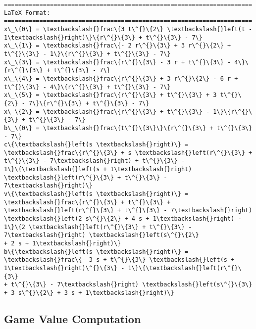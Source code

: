 \documentclass[../../main/main.tex]{subfiles}
\begin{document}
    \begin{Verbatim}[commandchars=\\\{\}]
======================================================================
LaTeX Format:
======================================================================
x\_\{0\} = \textbackslash{}frac\{3 t\^{}\{2\} \textbackslash{}left(t - 1\textbackslash{}right)\}\{r\^{}\{3\} + t\^{}\{3\} - 7\}
x\_\{1\} = \textbackslash{}frac\{- 2 r\^{}\{3\} + 3 r\^{}\{2\} + t\^{}\{3\} - 1\}\{r\^{}\{3\} + t\^{}\{3\} - 7\}
x\_\{3\} = \textbackslash{}frac\{r\^{}\{3\} - 3 r + t\^{}\{3\} - 4\}\{r\^{}\{3\} + t\^{}\{3\} - 7\}
x\_\{4\} = \textbackslash{}frac\{r\^{}\{3\} + 3 r\^{}\{2\} - 6 r + t\^{}\{3\} - 4\}\{r\^{}\{3\} + t\^{}\{3\} - 7\}
x\_\{5\} = \textbackslash{}frac\{r\^{}\{3\} + t\^{}\{3\} + 3 t\^{}\{2\} - 7\}\{r\^{}\{3\} + t\^{}\{3\} - 7\}
x\_\{2\} = \textbackslash{}frac\{r\^{}\{3\} + t\^{}\{3\} - 1\}\{r\^{}\{3\} + t\^{}\{3\} - 7\}
b\_\{0\} = \textbackslash{}frac\{t\^{}\{3\}\}\{r\^{}\{3\} + t\^{}\{3\} - 7\}
c\{\textbackslash{}left(s \textbackslash{}right)\} = \textbackslash{}frac\{r\^{}\{3\} + s \textbackslash{}left(r\^{}\{3\} + t\^{}\{3\} - 7\textbackslash{}right) + t\^{}\{3\} -
1\}\{\textbackslash{}left(s + 1\textbackslash{}right) \textbackslash{}left(r\^{}\{3\} + t\^{}\{3\} - 7\textbackslash{}right)\}
v\{\textbackslash{}left(s \textbackslash{}right)\} = \textbackslash{}frac\{r\^{}\{3\} + t\^{}\{3\} + \textbackslash{}left(r\^{}\{3\} + t\^{}\{3\} - 7\textbackslash{}right)
\textbackslash{}left(2 s\^{}\{2\} + 4 s + 1\textbackslash{}right) - 1\}\{2 \textbackslash{}left(r\^{}\{3\} + t\^{}\{3\} - 7\textbackslash{}right) \textbackslash{}left(s\^{}\{2\}
+ 2 s + 1\textbackslash{}right)\}
b\{\textbackslash{}left(s \textbackslash{}right)\} = \textbackslash{}frac\{- 3 s + t\^{}\{3\} \textbackslash{}left(s + 1\textbackslash{}right)\^{}\{3\} - 1\}\{\textbackslash{}left(r\^{}\{3\}
+ t\^{}\{3\} - 7\textbackslash{}right) \textbackslash{}left(s\^{}\{3\} + 3 s\^{}\{2\} + 3 s + 1\textbackslash{}right)\}
    \end{Verbatim}

    \subsection{Game Value Computation}\label{game-value-computation}
\end{document}
